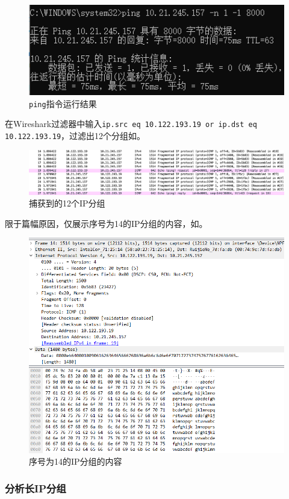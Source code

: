 \documentclass[lang=cn,11pt,a4paper,cite=authornum]{paper}
\begin{document}
\begin{figure}[htbp]
    \centering
    \includegraphics[width=0.5\linewidth]{./Images/ping.png}
    \caption{\texttt{ping}指令运行结果\label{fig:ping}}
\end{figure}

在Wireshark过滤器中输入\texttt{ip.src eq 10.122.193.19 or ip.dst eq 10.122.193.19}，过滤出12个分组如。

\begin{figure}[htbp]
    \centering
    \includegraphics[width=\linewidth]{./Images/IP.png}
    \caption{捕获到的12个IP分组\label{fig:ips}}
\end{figure}

限于篇幅原因，仅展示序号为14的IP分组的内容，如。

\begin{figure}[htbp]
    \centering
    \includegraphics[width=0.7\linewidth]{./Images/IP1.png}
    \caption{序号为14的IP分组的内容\label{fig:ip1}}
\end{figure}

\subsubsection{分析长IP分组}
\end{document}
